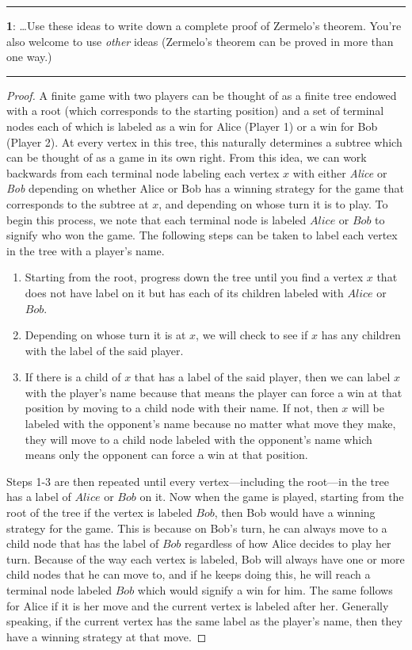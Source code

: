 \documentclass[11pt]{article}
\newcommand\question[2]{\vspace{.25in}\hrule\textbf{#1}: #2\vspace{.5em}\hrule\vspace{.10in}}
\begin{document}
\question{1}{\ldots Use these ideas to write down a complete proof of Zermelo's theorem. You're also welcome to use \textit{other} ideas (Zermelo's theorem can be proved in more than one way.)}
\begin{proof}
	A finite game with two players can be thought of as a finite tree endowed with a root (which corresponds to the starting position) and a set of terminal nodes each of which is labeled as a win for Alice (Player 1) or a win for Bob (Player 2). At every vertex in this tree, this naturally determines a subtree which can be thought of as a game in its own right. From this idea, we can work backwards from each terminal node labeling each vertex $x$ with either \textit{Alice} or \textit{Bob} depending on whether Alice or Bob has a winning strategy for the game that corresponds to the subtree at $x$, and depending on whose turn it is to play. 
	To begin this process, we note that each terminal node is labeled $Alice$ or $Bob$ to signify who won the game. The following steps can be taken to label each vertex in the tree with a player's name.
	\begin{enumerate}
		\item Starting from the root, progress down the tree until you find a vertex $x$ that does not have label on it but has each of its children labeled with $Alice$ or $Bob$.
		\item Depending on whose turn it is at $x$, we will check to see if $x$ has any children with the label of the said player. 
		\item If there is a child of $x$ that has a label of the said player, then we can label $x$ with the player's name because that means the player can force a win at that position by moving to a child node with their name. If not, then $x$ will be labeled with the opponent's name because no matter what move they make, they will move to a child node labeled with the opponent's name which means only the opponent can force a win at that position.
	\end{enumerate}
	Steps 1-3 are then repeated until every vertex—including the root—in the tree has a label of $Alice$ or $Bob$ on it. Now when the game is played, starting from the root of the tree if the vertex is labeled $Bob$, then Bob would have a winning strategy for the game. This is because on Bob's turn, he can always move to a child node that has the label of $Bob$ regardless of how Alice decides to play her turn. Because of the way each vertex is labeled, Bob will always have one or more child nodes that he can move to, and if he keeps doing this, he will reach a terminal node labeled $Bob$ which would signify a win for him. The same follows for Alice if it is her move and the current vertex is labeled after her. Generally speaking, if the current vertex has the same label as the player's name, then they have a winning strategy at that move.
\end{proof}
\end{document}
